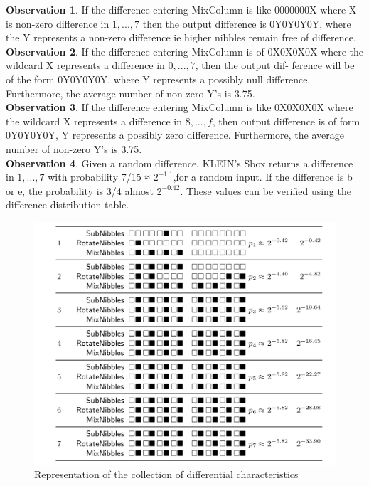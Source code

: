 \documentclass[preprint]{transcrypto}
\begin{document}
\textbf{Observation 1}. If the difference entering MixColumn is like 0000000X
where X is non-zero difference in ${1, . . . , 7}$ then the output difference is 0Y0Y0Y0Y, where the Y
represents a non-zero difference ie higher nibbles remain free of difference.\\
\textbf{Observation 2}. If the difference entering MixColumn is of  0X0X0X0X
where the wildcard X represents a difference in ${0, . . . , 7}$, then the output dif-
ference will be of the form 0Y0Y0Y0Y, where Y represents a possibly null difference.
Furthermore, the average number of non-zero Y’s is 3.75.\\
\textbf{Observation 3}. If the difference entering MixColumn is like 0X0X0X0X where the wildcard X represents a difference in ${8, . . . , f}$, then output difference is of form 0Y0Y0Y0Y, Y represents a possibly zero difference. Furthermore, the average number of non-zero Y’s is 3.75.\\
\textbf{Observation 4}. Given a random difference, KLEIN’s Sbox returns a difference in ${1, . . . , 7}$ with probability 7/15 ≈ $2^{−1.1}$,for a random input. If the difference is b or e, the probability is 3/4 almost $2^{−0.42}$. These values can be verified using the difference distribution table.\\

\begin{figure}
    \centering
    \includegraphics[width= \textwidth]{images/Representationcollectiondifferentialcharacteristics.png} 
    \caption{Representation of the collection of differential characteristics}
    \label{fig:6distinguisher}
\end{figure}
\end{document}
